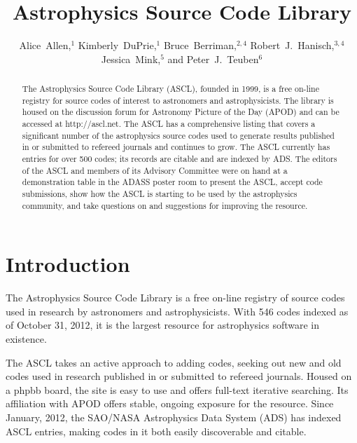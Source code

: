 
\resetcounters




\title{Astrophysics Source Code Library}

\author{Alice~Allen,$^1$ Kimberly~DuPrie,$^1$ Bruce~Berriman,$^{2,4}$ Robert~J.~Hanisch,$^{3,4}$ Jessica~Mink,$^5$ and Peter~J.~Teuben$^6$
}


\begin{abstract}

The Astrophysics Source Code Library (ASCL), founded in 1999, is a
free on-line registry for source codes of interest to astronomers and
astrophysicists. The library is housed on the discussion forum for
Astronomy Picture of the Day (APOD) and can be accessed at
http://ascl.net. The ASCL has a comprehensive listing that covers a
significant number of the astrophysics source codes used to generate
results published in or submitted to refereed journals and continues
to grow. The ASCL currently has entries for over 500 codes; its
records are citable and are indexed by ADS. The editors of the ASCL
and members of its Advisory Committee were on hand at a demonstration table in the ADASS poster room to present
the ASCL, accept code submissions, show how the ASCL is starting to be
used by the astrophysics community, and take questions on and
suggestions for improving the resource.
\end{abstract}

\section{Introduction}

The Astrophysics Source Code Library is a free on-line registry of source codes used in research by astronomers and astrophysicists. With 546 codes indexed as of October 31, 2012, it is the largest resource for astrophysics software in existence. 

The ASCL takes an active approach to adding codes, seeking out new and old codes used in research published in or submitted to refereed journals. Housed on a phpbb board, the site is easy to use and offers full-text iterative searching. Its affiliation with APOD offers stable, ongoing exposure for the resource. Since January, 2012, the SAO/NASA Astrophysics Data System (ADS) has indexed ASCL entries, making codes in it both easily discoverable and citable.

